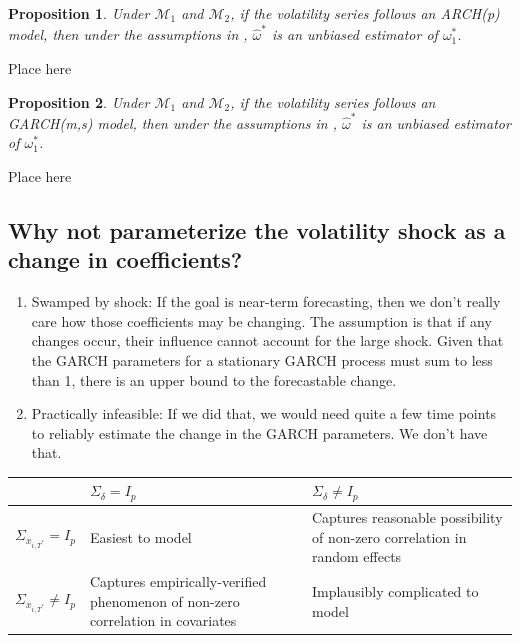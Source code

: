 \documentclass[11pt]{article}
\def\mc#1{\mathcal{#1}} %
\def\mc#1{\mathcal{#1}}
\newtheorem{prop}{Proposition}
\theoremstyle{definition}
\newenvironment{proof-of-proposition}[1][{}]{\noindent{\bf
    Proof of Proposition {#1}}
  \hspace*{.5em}}{\qed\bigskip\\}
\begin{document}
\begin{prop}
Under $\mc{M}_1$ and $\mc{M}_2$,  if the volatility series follows an ARCH(p) model, then under the assumptions in \citet{abadie2010synthetic}, $\hat\omega^{*}$ is an unbiased estimator of $\omega_{1}^{*}$.
\end{prop}

\begin{proof-of-proposition}
Place here
\end{proof-of-proposition}

\begin{prop}
Under $\mc{M}_1$ and $\mc{M}_2$,  if the volatility series follows an GARCH(m,s) model, then under the assumptions in \citet{abadie2010synthetic}, $\hat\omega^{*}$ is an unbiased estimator of $\omega_{1}^{*}$.
\end{prop}

\begin{proof-of-proposition}
Place here
\end{proof-of-proposition}

\subsection{Why not parameterize the volatility shock as a change in coefficients?}
\begin{enumerate}
\item Swamped by shock: If the goal is near-term forecasting, then we don't really care how those coefficients may be changing.  The assumption is that if any changes occur, their influence cannot account for the large shock. Given that the GARCH parameters for a stationary GARCH process must sum to less than 1, there is an upper bound to the forecastable change.
\item Practically infeasible: If we did that, we would need quite a few time points to reliably estimate the change in the GARCH parameters.  We don't have that.
\end{enumerate}

\begin{table}[]
\begin{tabular}{|p{1.2in}|p{1.9in}|p{1.9in}|}
\hline
  & $\Sigma_{\delta} = I_{p}$ & $\Sigma_{\delta} \neq I_{p}$  \\ \hline
 $\Sigma_{x_{i,T^{*}}} = I_{p}$ & Easiest to model & Captures reasonable possibility of non-zero correlation in random effects \\ \hline
 $\Sigma_{x_{i,T^{*}}} \neq I_{p}$ & Captures empirically-verified phenomenon of non-zero correlation in covariates & Implausibly complicated to model  \\ \hline
\end{tabular}
\end{table}
\end{document}

